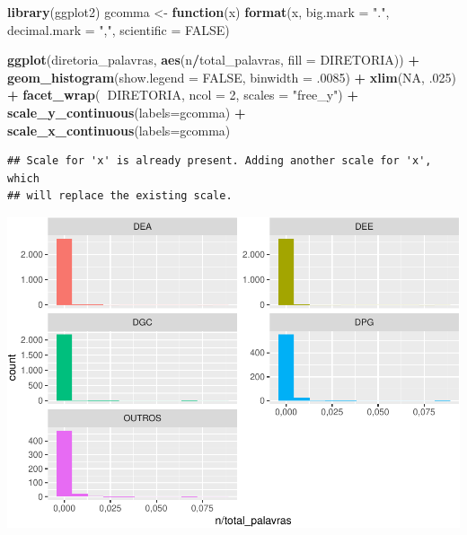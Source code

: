 \documentclass[]{article}
\newenvironment{Shaded}{\begin{snugshade}}{\end{snugshade}}
\newcommand{\KeywordTok}[1]{\textcolor[rgb]{0.13,0.29,0.53}{\textbf{#1}}}
\newcommand{\DataTypeTok}[1]{\textcolor[rgb]{0.13,0.29,0.53}{#1}}
\newcommand{\DecValTok}[1]{\textcolor[rgb]{0.00,0.00,0.81}{#1}}
\newcommand{\StringTok}[1]{\textcolor[rgb]{0.31,0.60,0.02}{#1}}
\newcommand{\OtherTok}[1]{\textcolor[rgb]{0.56,0.35,0.01}{#1}}
\newcommand{\ControlFlowTok}[1]{\textcolor[rgb]{0.13,0.29,0.53}{\textbf{#1}}}
\newcommand{\OperatorTok}[1]{\textcolor[rgb]{0.81,0.36,0.00}{\textbf{#1}}}
\newcommand{\NormalTok}[1]{#1}
\begin{document}
\begin{Shaded}
\begin{Highlighting}[]
\KeywordTok{library}\NormalTok{(ggplot2)}
\NormalTok{gcomma <-}\StringTok{ }\ControlFlowTok{function}\NormalTok{(x) }\KeywordTok{format}\NormalTok{(x, }\DataTypeTok{big.mark =} \StringTok{"."}\NormalTok{, }\DataTypeTok{decimal.mark =} \StringTok{","}\NormalTok{, }\DataTypeTok{scientific =} \OtherTok{FALSE}\NormalTok{) }

\KeywordTok{ggplot}\NormalTok{(diretoria_palavras, }\KeywordTok{aes}\NormalTok{(n}\OperatorTok{/}\NormalTok{total_palavras, }\DataTypeTok{fill =}\NormalTok{ DIRETORIA)) }\OperatorTok{+}
\KeywordTok{geom_histogram}\NormalTok{(}\DataTypeTok{show.legend =} \OtherTok{FALSE}\NormalTok{, }\DataTypeTok{binwidth =}\NormalTok{ .}\DecValTok{0085}\NormalTok{) }\OperatorTok{+}\StringTok{ }\KeywordTok{xlim}\NormalTok{(}\OtherTok{NA}\NormalTok{, .}\DecValTok{025}\NormalTok{) }\OperatorTok{+}
\KeywordTok{facet_wrap}\NormalTok{(}\OperatorTok{~}\NormalTok{DIRETORIA, }\DataTypeTok{ncol =} \DecValTok{2}\NormalTok{, }\DataTypeTok{scales =} \StringTok{"free_y"}\NormalTok{) }\OperatorTok{+}
\StringTok{  }\KeywordTok{scale_y_continuous}\NormalTok{(}\DataTypeTok{labels=}\NormalTok{gcomma) }\OperatorTok{+}\StringTok{ }
\StringTok{  }\KeywordTok{scale_x_continuous}\NormalTok{(}\DataTypeTok{labels=}\NormalTok{gcomma)}
\end{Highlighting}
\end{Shaded}

\begin{verbatim}
## Scale for 'x' is already present. Adding another scale for 'x', which
## will replace the existing scale.
\end{verbatim}

\includegraphics{markdown_v31_files/figure-latex/unnamed-chunk-27-1.pdf}
\end{document}
